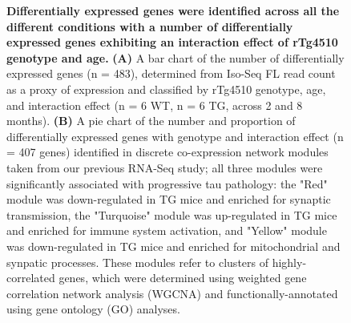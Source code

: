 \begin{figure}[h]
	{\textbf{Differentially expressed genes were identified across all the different conditions with a number of differentially expressed genes exhibiting an interaction effect of rTg4510 genotype and age.} \textbf{(A)} A bar chart of the number of differentially expressed genes (n = 483), determined from Iso-Seq FL read count as a proxy of expression and classified by rTg4510 genotype, age, and interaction effect (n = 6 WT, n = 6 TG, across 2 and 8 months). \textbf{(B)} A pie chart of the number and proportion of differentially expressed genes with genotype and interaction effect (n = 407 genes) identified in discrete co-expression network modules taken from our previous RNA-Seq study\cite{Castanho2020}; all three modules were significantly associated with progressive tau pathology: the "Red" module was down-regulated in TG mice and enriched for synaptic transmission, the "Turquoise" module was up-regulated in TG mice and enriched for immune system activation, and "Yellow" module was down-regulated in TG mice and enriched for mitochondrial and synpatic processes. These modules refer to clusters of highly-correlated genes, which were determined using weighted gene correlation network analysis (WGCNA)\cite{Langfelder2008} and functionally-annotated using gene ontology (GO) analyses\cite{Young2010}.}    
	\label{fig:dea_model_num}
\end{figure}


